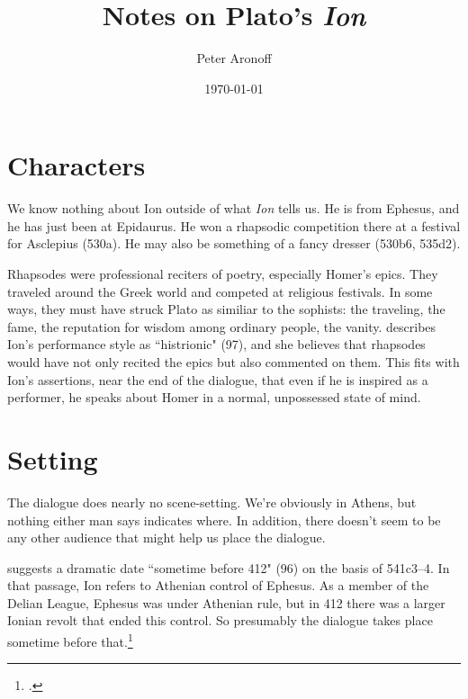 \documentclass[11pt,letterpaper]{article}
\title{Notes on Plato's \textit{Ion}}
\author{Peter Aronoff}
\date{\today}
\begin{document}
\maketitle


\section{Characters}

We know nothing about Ion outside of what \textit{Ion} tells us. He is from
Ephesus, and he has just been at Epidaurus. He won a rhapsodic competition
there at a festival for Asclepius (530a). He may also be something of
a fancy dresser (530b6, 535d2).

Rhapsodes were professional reciters of poetry, especially Homer's epics.
They traveled around the Greek world and competed at religious festivals.
In some ways, they must have struck Plato as similiar to the sophists: the
traveling, the fame, the reputation for wisdom among ordinary people, the
vanity. \textcite{murray1996} describes Ion's performance style as
``histrionic" (97), and she believes that rhapsodes would have not only
recited the epics but also commented on them. This fits with Ion's
assertions, near the end of the dialogue, that even if he is inspired as
a performer, he speaks about Homer in a normal, unpossessed state of mind.


\section{Setting}

The dialogue does nearly no scene-setting. We're obviously in Athens, but nothing either man says indicates where. In addition, there doesn't seem to be any other audience that might help us place the dialogue.

\textcite{murray1996} suggests a dramatic date ``sometime before 412" (96) on the basis of 541c3--4. In that passage, Ion refers to Athenian control of Ephesus. As a member of the Delian League, Ephesus was under Athenian rule, but in 412 there was a larger Ionian revolt that ended this control. So presumably the dialogue takes place sometime before that.\footcites[See][]{moore1974}[and also][28--31, 163--4]{canto2001}


\end{document}
